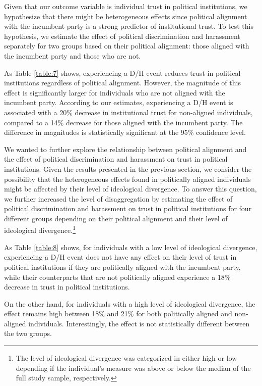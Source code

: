 \documentclass{article}
\begin{document}
Given that our outcome variable is individual trust in political institutions, we hypothesize that there might be heterogeneous effects since political alignment with the incumbent party is a strong predictor of institutional trust. To test this hypothesis, we estimate the effect of political discrimination and harassment separately for two groups based on their political alignment: those aligned with the incumbent party and those who are not.

As Table \ref{table:7} shows, experiencing a D/H event reduces trust in political institutions regardless of political alignment. However, the magnitude of this effect is significantly larger for individuals who are not aligned with the incumbent party. According to our estimates, experiencing a D/H event is associated with a 20\% decrease in institutional trust for non-aligned individuals, compared to a 14\% decrease for those aligned with the incumbent party. The difference in magnitudes is statistically significant at the 95\% confidence level.

 
 

We wanted to further explore the relationship between political alignment and the effect of political discrimination and harassment on trust in political institutions. Given the results presented in the previous section, we consider the possibility that the heterogeneous effects found in politically aligned individuals might be affected by their level of ideological divergence. To answer this question, we further increased the level of disaggregation by estimating the effect of political discrimination and harassment on trust in political institutions for four different groups depending on their political alignment and their level of ideological divergence.\footnote{The level of ideological divergence was categorized in either high or low depending if the individual's measure was above or below the median of the full study sample, respectively.}

As Table \ref{table:8} shows, for individuals with a low level of ideological divergence, experiencing a D/H event does not have any effect on their level of trust in political institutions if they are politically aligned with the incumbent party, while their counterparts that are not politically aligned experience a 18\% decrease in trust in political institutions.

On the other hand, for individuals with a high level of ideological divergence, the effect remains high between 18\% and 21\% for both politically aligned and non-aligned individuals. Interestingly, the effect is not statistically different between the two groups.
\end{document}
